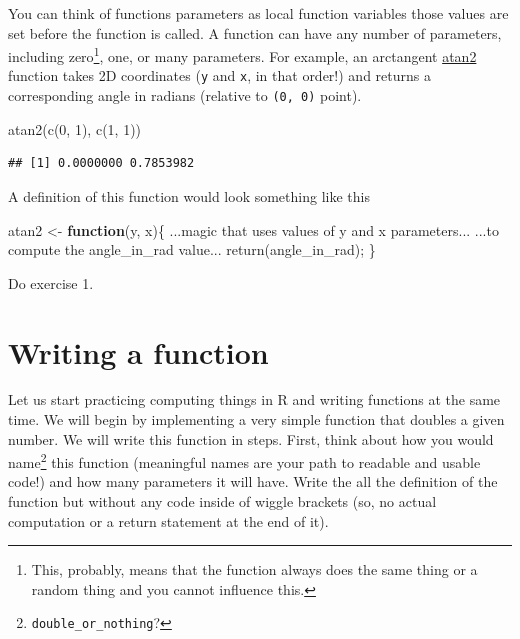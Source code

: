 \documentclass[
]{book}
\newenvironment{Shaded}{\begin{snugshade}}{\end{snugshade}}
\newcommand{\ControlFlowTok}[1]{\textcolor[rgb]{0.13,0.29,0.53}{\textbf{#1}}}
\newcommand{\DecValTok}[1]{\textcolor[rgb]{0.00,0.00,0.81}{#1}}
\newcommand{\FunctionTok}[1]{\textcolor[rgb]{0.00,0.00,0.00}{#1}}
\newcommand{\NormalTok}[1]{#1}
\newcommand{\OtherTok}[1]{\textcolor[rgb]{0.56,0.35,0.01}{#1}}
\begin{document}
You can think of functions parameters as local function variables those values are set before the function is called. A function can have any number of parameters, including zero\footnote{This, probably, means that the function always does the same thing or a random thing and you cannot influence this.}, one, or many parameters. For example, an arctangent \href{https://stat.ethz.ch/R-manual/R-devel/library/base/html/Trig.html}{atan2} function takes 2D coordinates (\texttt{y} and \texttt{x}, in that order!) and returns a corresponding angle in radians (relative to \texttt{(0,\ 0)} point).

\begin{Shaded}
\begin{Highlighting}[]
\FunctionTok{atan2}\NormalTok{(}\FunctionTok{c}\NormalTok{(}\DecValTok{0}\NormalTok{, }\DecValTok{1}\NormalTok{), }\FunctionTok{c}\NormalTok{(}\DecValTok{1}\NormalTok{, }\DecValTok{1}\NormalTok{))}
\end{Highlighting}
\end{Shaded}

\begin{verbatim}
## [1] 0.0000000 0.7853982
\end{verbatim}

A definition of this function would look something like this

\begin{Shaded}
\begin{Highlighting}[]
\NormalTok{atan2 }\OtherTok{\textless{}{-}} \ControlFlowTok{function}\NormalTok{(y, x)\{}
\NormalTok{  ...magic that uses values of y and x parameters...}
\NormalTok{  ...to compute the angle\_in\_rad value...}
  \FunctionTok{return}\NormalTok{(angle\_in\_rad);}
\NormalTok{\}}
\end{Highlighting}
\end{Shaded}

Do exercise 1.

\hypertarget{writing-a-function}{%
\section{Writing a function}\label{writing-a-function}}

Let us start practicing computing things in R and writing functions at the same time. We will begin by implementing a very simple function that doubles a given number. We will write this function in steps. First, think about how you would name\footnote{\texttt{double\_or\_nothing}?} this function (meaningful names are your path to readable and usable code!) and how many parameters it will have. Write the all the definition of the function but without any code inside of wiggle brackets (so, no actual computation or a return statement at the end of it).
\end{document}
